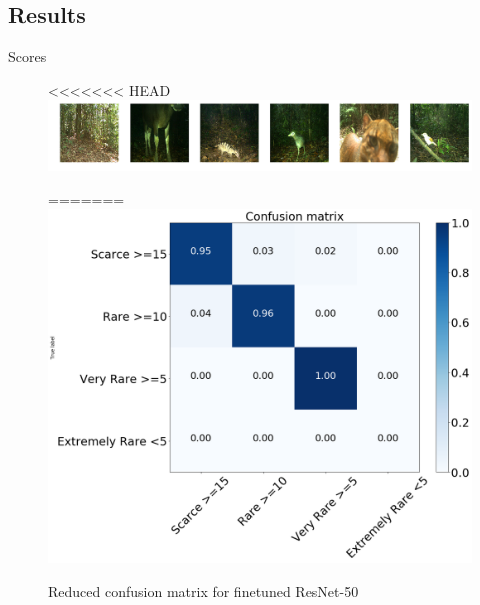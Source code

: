\documentclass[10pt]{beamer}
\begin{document}
\subsection{Results}

\begin{frame}{Scores}
	\centering
	\begin{minipage}[r]{0.58\linewidth}
		\begin{figure}
<<<<<<< HEAD
			\hfill
			\hspace*{.5cm}\includegraphics[width=.8\columnwidth]{images/images_below.png}
			\caption{Reduced confusion matrix for finetuned ResNet-50}
=======
			\includegraphics[width=\columnwidth]{images/conf_mat_leo_v2.png}

\end{figure}
\end{minipage}
\end{frame}
\end{document}
